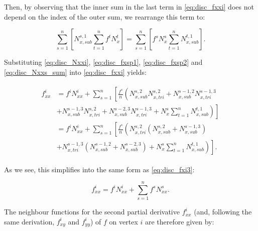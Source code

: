\documentclass{article}
\begin{document}
Then, by observing that the inner sum in the last term in \eqref{eq:disc_fxxi} does not depend on the index of the outer sum, we rearrange this term to:

\begin{equation} \label{eq:disc_Nxxs_sum}
\sum_{s=1}^n \left[ N_{x,sub}^{s,1} \sum_{t=1}^n f^t N_x^t \right] = \sum_{s=1}^n \left[ f^s N_x^s \sum_{t=1}^n N_{x,sub}^{t,1} \right].
\end{equation}

Substituting \eqref{eq:disc_Nxxi}, \eqref{eq:disc_fxsp1}, \eqref{eq:disc_fxsp2} and \eqref{eq:disc_Nxxs_sum} into \eqref{eq:disc_fxxi} yields:

\begin{align} \label{eq:disc_fxxi2}
\begin{split}
f_{xx}^i &= f^i N_{xx}^i + \sum_{s=1}^n \left[ \frac{f^s}{n} \left( N_{x,sub}^{s,2} N_{x,tri}^{s,2} + N_{x,sub}^{s-1,2} N_{x,tri}^{s-1,3} \right. \right. \\
 & \left. \left. + N_{x,sub}^{s-1,3} N_{x,tri}^{s,2} + N_{x,sub}^{s-2,3} N_{x,tri}^{s-1,3} + N_x^s \sum_{t=1}^n N_{x,sub}^{t,1} \right) \right] \\
& = f^i N_{xx}^i + \sum_{s=1}^n \left[ \frac{f^s}{n} \left( N_{x,tri}^{s,2} \left( N_{x,sub}^{s,2} + N_{x,sub}^{s-1,3} \right) \right. \right. \\
 & \left. \left. + N_{x,tri}^{s-1,3} \left( N_{x,sub}^{s-1,2} + N_{x,sub}^{s-2,3} \right) + N_x^s \sum_{t=1}^n N_{x,sub}^{t,1} \right) \right].
\end{split}
\end{align}

As we see, this simplifies into the same form as \eqref{eq:disc_fxi3}:

\begin{equation} \label{eq:disc_fxxi3}
f_{xx}^i = f^i N_{xx}^i + \sum_{s=1}^n f^s N_{xx}^s.
\end{equation}

The neighbour functions for the second partial derivative $f_{xx}^i$ (and, following the same derivation, $f_{xy}^i$ and $f_{yy}^i$) of $f$ on vertex $i$ are therefore given by:
\end{document}
